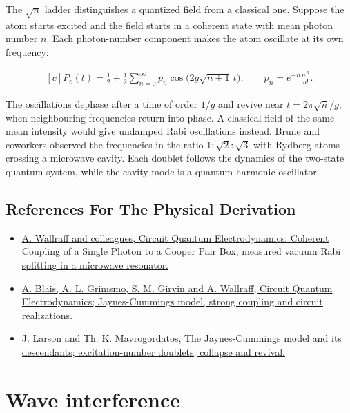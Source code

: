 \documentclass[11pt,oneside]{book}
\newenvironment{centeredalign}{\[\begin{gathered}[c]}{\end{gathered}\]}
\begin{document}
The \(\sqrt n\) ladder distinguishes a quantized field from a classical one. Suppose the atom starts excited and the field starts in a coherent state with mean photon number \(\bar n\). Each photon-number component makes the atom oscillate at its own frequency:

\begin{centeredalign}
P_e(t)=\frac12+\frac12\sum_{n=0}^\infty p_n\cos\big(2g\sqrt{n+1}\,t\big),
\qquad p_n=e^{-\bar n}\frac{\bar n^{\,n}}{n!}.
\end{centeredalign}

The oscillations dephase after a time of order \(1/g\) and revive near \(t=2\pi\sqrt{\bar n}/g\), when neighbouring frequencies return into phase. A classical field of the same mean intensity would give undamped Rabi oscillations instead. Brune and coworkers observed the frequencies in the ratio \(1:\sqrt2:\sqrt3\) with Rydberg atoms crossing a microwave cavity. Each doublet follows the dynamics of the two-state quantum system, while the cavity mode is a quantum harmonic oscillator.

\subsection*{References For The Physical Derivation}
\begin{itemize}
\item \href{https://arxiv.org/abs/cond-mat/0407325}{A. Wallraff and colleagues, Circuit Quantum Electrodynamics: Coherent Coupling of a Single Photon to a Cooper Pair Box; measured vacuum Rabi splitting in a microwave resonator.}
\item \href{https://arxiv.org/abs/2005.12667}{A. Blais, A. L. Grimsmo, S. M. Girvin and A. Wallraff, Circuit Quantum Electrodynamics; Jaynes-Cummings model, strong coupling and circuit realizations.}
\item \href{https://arxiv.org/abs/2202.00330}{J. Larson and Th. K. Mavrogordatos, The Jaynes-Cummings model and its descendants; excitation-number doublets, collapse and revival.}
\end{itemize}





\clearpage

\section{Wave interference}

\label{topic:wave-interference}
\end{document}
